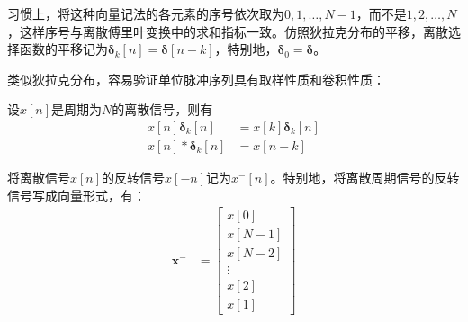 习惯上，将这种向量记法的各元素的序号依次取为$0,1,\dots,N-1$，而不是$1,2,\dots,N$，这样序号与离散傅里叶变换中的求和指标一致。仿照狄拉克分布的平移，离散选择函数的平移记为$\boldsymbol{\delta}_k[n]=\boldsymbol{\delta}[n-k]$，特别地，$\boldsymbol{\delta}_0=\boldsymbol{\delta}$。

类似狄拉克分布，容易验证单位脉冲序列具有取样性质和卷积性质：
\begin{proposition}
    设$x[n]$是周期为$N$的离散信号，则有
    \begin{align*}
        x[n]\boldsymbol{\delta}_k[n]&=x[k]\boldsymbol{\delta}_k[n]\\
        x[n]*\boldsymbol{\delta}_k[n]&=x[n-k]
    \end{align*}
\end{proposition}

\begin{definition}[离散信号的反转]
    将离散信号$x[n]$的反转信号$x[-n]$记为$x^-[n]$。特别地，将离散周期信号的反转信号写成向量形式，有：
    \begin{align*}
    \textbf{x}^-&=\begin{bmatrix}
x[0]  \\
x[N-1]  \\
x[N-2]\\
\vdots \\
x[2]\\
x[1]
\end{bmatrix}\end{align*}
\end{definition}

